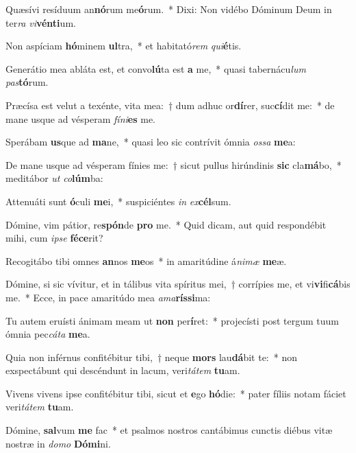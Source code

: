 \item Quæsívi resíduum an\textbf{nó}rum me\textbf{ó}rum.~* Dixi: Non vidébo Dóminum Deum in ter\textit{ra} \textit{vi}\textbf{vén}\textbf{ti}um.
\item Non aspíciam \textbf{hó}minem \textbf{ul}tra,~* et habitató\textit{rem} \textit{qui}\textbf{é}tis.
\item Generátio mea abláta est, et convo\textbf{lú}ta est \textbf{a} me,~* quasi tabernácu\textit{lum} \textit{pas}\textbf{tó}rum.
\item Præcísa est velut a texénte, vita mea:~† dum adhuc or\textbf{dí}rer, suc\textbf{cí}dit me:~* de mane usque ad vésperam \textit{fí}\textit{ni}\textbf{es} me.
\item Sperábam \textbf{us}que ad \textbf{ma}ne,~* quasi leo sic contrívit ómnia \textit{os}\textit{sa} \textbf{me}a:
\item De mane usque ad vésperam fínies me:~† sicut pullus hirúndinis \textbf{sic} cla\textbf{má}bo,~* meditábor \textit{ut} \textit{co}\textbf{lúm}ba:
\item Attenuáti sunt \textbf{ó}culi \textbf{me}i,~* suspiciéntes \textit{in} \textit{ex}\textbf{cél}sum.
\item Dómine, vim pátior, re\textbf{spón}de \textbf{pro} me.~* Quid dicam, aut quid respondébit mihi, cum \textit{ip}\textit{se} \textbf{fé}\textbf{ce}rit?
\item Recogitábo tibi omnes \textbf{an}nos \textbf{me}os~* in amaritúdine á\textit{ni}\textit{mæ} \textbf{me}æ.
\item Dómine, si sic vívitur, et in tálibus vita spíritus mei,~† corrípies me, et vi\textbf{vi}fi\textbf{cá}bis me.~* Ecce, in pace amaritúdo mea \textit{a}\textit{ma}\textbf{rís}\textbf{si}ma:
\item Tu autem eruísti ánimam meam ut \textbf{non} per\textbf{í}ret:~* projecísti post tergum tuum ómnia pec\textit{cá}\textit{ta} \textbf{me}a.
\item Quia non inférnus confitébitur tibi,~† neque \textbf{mors} lau\textbf{dá}bit te:~* non exspectábunt qui descéndunt in lacum, veri\textit{tá}\textit{tem} \textbf{tu}am.
\item Vivens vivens ipse confitébitur tibi, sicut et \textbf{e}go \textbf{hó}die:~* pater fíliis notam fáciet veri\textit{tá}\textit{tem} \textbf{tu}am.
\item Dómine, \textbf{sal}vum \textbf{me} fac~* et psalmos nostros cantábimus cunctis diébus vitæ nostræ in \textit{do}\textit{mo} \textbf{Dó}\textbf{mi}ni.

